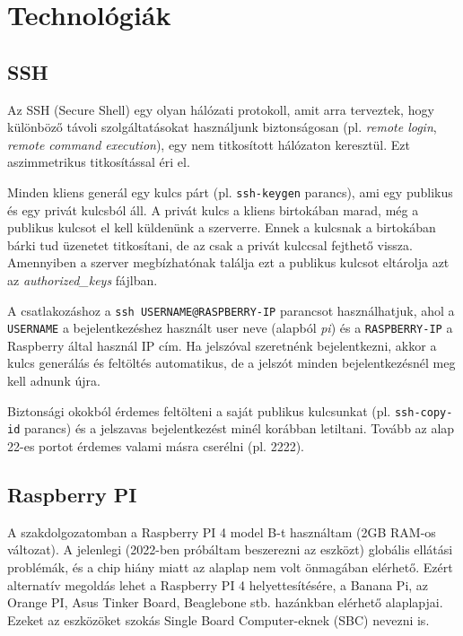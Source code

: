 \documentclass[
]{thesis-ekf}
\theoremstyle{definition}
\theoremstyle{remark}
\begin{document}
\section{Technológiák}
\subsection{SSH} \label{ssh}
Az SSH (Secure Shell) egy olyan hálózati protokoll, amit arra terveztek, hogy különböző távoli szolgáltatásokat használjunk biztonságosan (pl. \emph{remote login}, \emph{remote command execution}), egy nem titkosított hálózaton keresztül. Ezt aszimmetrikus titkosítással éri el. \cite{ssh-rfc}

Minden kliens generál egy kulcs párt (pl. \texttt{ssh-keygen} parancs), ami egy publikus és egy privát kulcsból áll. A privát kulcs a kliens birtokában marad, még a publikus kulcsot el kell küldenünk a szerverre. Ennek a kulcsnak a birtokában bárki tud üzenetet titkosítani, de az csak a privát kulccsal fejthető vissza. Amennyiben a szerver megbízhatónak találja ezt a publikus kulcsot eltárolja azt az \emph{authorized\_keys} fájlban. \cite{ssh-keys}\cite{setup-ssh} 

A csatlakozáshoz a \texttt{ssh USERNAME@RASPBERRY-IP} parancsot használhatjuk, ahol a \texttt{USERNAME} a bejelentkezéshez használt user neve (alapból \emph{pi}) és a \texttt{RASPBERRY-IP} a Raspberry által használ IP cím. Ha jelszóval szeretnénk bejelentkezni, akkor a kulcs generálás és feltöltés automatikus, de a jelszót minden bejelentkezésnél meg kell adnunk újra. 

Biztonsági okokból érdemes feltölteni a saját publikus kulcsunkat (pl. \texttt{ssh-copy-id} parancs) és a jelszavas bejelentkezést minél korábban letiltani. Tovább az alap 22-es portot érdemes valami másra cserélni (pl. 2222).

\subsection{Raspberry PI}
A szakdolgozatomban a Raspberry PI 4 model B-t használtam (2GB RAM-os változat). A jelenlegi (2022-ben próbáltam beszerezni az eszközt) globális ellátási problémák, és a chip hiány miatt az alaplap nem volt önmagában elérhető. Ezért alternatív megoldás lehet a Raspberry PI 4 helyettesítésére, a  Banana Pi, az Orange PI, Asus Tinker Board, Beaglebone stb. hazánkban elérhető alaplapjai. \cite{alternatives} Ezeket az eszközöket szokás Single Board Computer-eknek (SBC) nevezni is.
\end{document}
